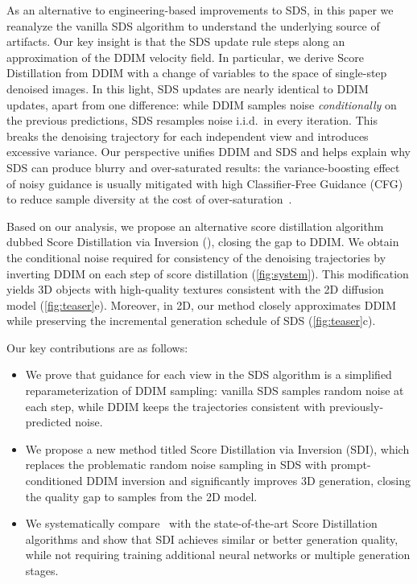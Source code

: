 As an alternative to engineering-based improvements to SDS, in this paper we reanalyze the vanilla SDS algorithm to understand the underlying source of artifacts. 
%
Our key insight is that the SDS update rule steps along an approximation of the DDIM velocity field.
In particular, we derive Score Distillation from DDIM with a change of variables to the space of single-step denoised images.  
%
In this light, SDS updates are nearly identical 
to DDIM updates, apart from one difference: while DDIM samples noise \textit{conditionally} on the 
previous predictions, SDS resamples noise i.i.d.\ in every iteration.
%
This breaks the denoising trajectory for each independent view and 
introduces excessive variance. 
%
Our perspective unifies DDIM and SDS and 
helps explain why SDS can produce blurry and over-saturated results:
the variance-boosting effect of noisy guidance is usually mitigated with high Classifier-Free Guidance (CFG)~\cite{ho2022classifier} 
to reduce sample diversity at the cost of over-saturation~\cite{lin2024common}.


Based on our analysis, we propose an alternative score distillation algorithm dubbed Score Distillation via Inversion (\ourmethod), 
closing the gap to DDIM.
We obtain the conditional noise required for consistency of the denoising trajectories 
by inverting DDIM on each step of score distillation (\cref{fig:system}).
%
This modification yields 3D objects with high-quality textures consistent with the 2D diffusion model (\cref{fig:teaser}e). 
%
Moreover, in 2D, our method closely approximates 
DDIM while preserving the incremental generation schedule of SDS (\cref{fig:teaser}c). 

Our key contributions are as follows:
{\allowdisplaybreaks
\begin{itemize}
    \item We prove that guidance for each view in the SDS algorithm is a simplified reparameterization of DDIM sampling: vanilla SDS samples random noise at each step, while DDIM keeps the trajectories consistent with previously-predicted noise.
    \item We propose a new method titled Score Distillation via Inversion (SDI), which replaces the problematic random noise sampling in SDS with 
    prompt-conditioned DDIM inversion and significantly improves 3D generation,
    closing the quality gap to samples from the 2D  model.
    \item We systematically compare \ourmethod ~with the state-of-the-art Score Distillation algorithms and show that SDI achieves similar or better generation quality, while not requiring training additional neural networks or multiple generation stages.
 \end{itemize}
}

